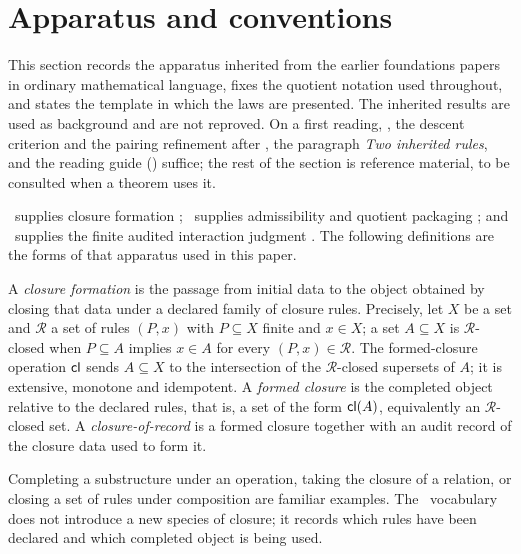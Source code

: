 \section{Apparatus and conventions}\label{sec:apparatus}

This section records the apparatus inherited from the earlier
foundations papers in ordinary mathematical language, fixes the
quotient notation used throughout, and states the template in which the
laws are presented.  The inherited results are used as background and
are not reproved.  On a first reading,
, the
descent criterion and the pairing refinement after
, the paragraph \emph{Two inherited rules}, and the
reading guide () suffice; the rest of the
section is reference material, to be consulted when a theorem uses it.

\FoundI\ supplies closure formation
\citep{Tsiokos2026EmergenceCalculus}; \FoundII\ supplies admissibility
and quotient packaging \citep{Tsiokos2026FoundationsII}; and
\FoundIII\ supplies the finite audited interaction judgment
\citep{Tsiokos2026FoundationsIII}.  The following definitions are the
forms of that apparatus used in this paper.

\begin{definition}\label{def:closure-formation}
A \emph{closure formation} is the passage from initial data to the
object obtained by closing that data under a declared family of closure
rules.  Precisely, let \(X\) be a set and \(\mathcal R\) a set of rules
\((P,x)\) with \(P\subseteq X\) finite and \(x\in X\); a set \(A\subseteq X\)
is \(\mathcal R\)-closed when \(P\subseteq A\) implies \(x\in A\) for every
\((P,x)\in\mathcal R\). The formed-closure operation \(\mathsf{cl}\) sends
\(A\subseteq X\) to the intersection of the \(\mathcal R\)-closed supersets
of \(A\); it is extensive, monotone and idempotent. A \emph{formed closure} is
the completed object relative to the declared rules, that is, a set of the
form \(\mathsf{cl}(A)\), equivalently an \(\mathcal R\)-closed set.  A
\emph{closure-of-record} is a formed closure together with an
audit record of the closure data used to form it.
\end{definition}

Completing a substructure under an operation, taking the closure
of a relation, or closing a set of rules under composition are familiar
examples.  The \FoundI\ vocabulary does not introduce a new species of
closure; it records which rules have been declared and which completed
object is being used.

